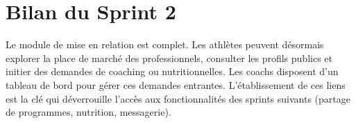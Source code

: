 \section{Bilan du Sprint 2}
Le module de mise en relation est complet. Les athlètes peuvent désormais explorer la place de marché des professionnels, consulter les profils publics et initier des demandes de coaching ou nutritionnelles. Les coachs disposent d'un tableau de bord pour gérer ces demandes entrantes. L'établissement de ces liens est la clé qui déverrouille l'accès aux fonctionnalités des sprints suivants (partage de programmes, nutrition, messagerie).
